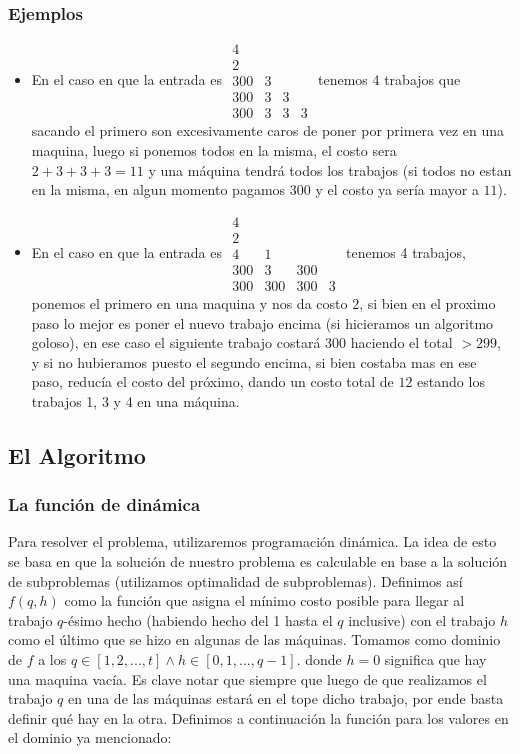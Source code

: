 \documentclass[A4paper,oneside,fleqn,11pt]{article}
\theoremstyle{definition}
\begin{document}
\subsubsection{Ejemplos}
\begin{itemize}
\item En el caso en que la entrada es $\begin{matrix}
  4 &  &  &  \\
  2 &  &  &  \\
  300 & 3 &  &  \\
  300 & 3 & 3 &  \\
  300 & 3 & 3 & 3 
\end{matrix}$ tenemos 4 trabajos que sacando el primero son excesivamente caros de poner por primera vez en una maquina, luego si ponemos todos en la misma, el costo sera $2+3+3+3=11$ y una máquina tendrá todos los trabajos (si todos no estan en la misma, en algun momento pagamos $300$ y el costo ya sería mayor a $11$).
\item En el caso en que la entrada es $\begin{matrix}
  4 &  &  &  \\
  2 &  &  &  \\
  4 & 1 &  &  \\
  300 & 3 & 300 &  \\
  300 & 300 & 300 & 3 
\end{matrix}$ tenemos 4 trabajos, ponemos el primero en una maquina y nos da costo $2$, si bien en el proximo paso lo mejor es poner el nuevo trabajo encima (si hicieramos un algoritmo goloso), en ese caso el siguiente trabajo costará $300$ haciendo el total $>299$, y si no hubieramos puesto el segundo encima, si bien costaba mas en ese paso, reducía el costo del próximo, dando un costo total de $12$ estando los trabajos 1, 3 y 4 en una máquina.
\end{itemize}


\subsection{El Algoritmo}

\subsubsection{La función de dinámica}
Para resolver el problema, utilizaremos programación dinámica. La idea de esto se basa en que la solución de nuestro problema es calculable en base a la solución de subproblemas (utilizamos optimalidad de subproblemas). Definimos así $f(q,h)$ como la función que asigna el mínimo costo posible para llegar al trabajo $q$-ésimo hecho (habiendo hecho del 1 hasta el $q$ inclusive) con el trabajo $h$ como el último que se hizo en algunas de las máquinas. Tomamos como dominio de $f$ a los $q \in [1,2,...,t] \land h \in [0,1,...,q-1]$. donde $h=0$ significa que hay una maquina vacía. Es clave notar que siempre que luego de que realizamos el trabajo $q$ en una de las máquinas estará en el tope dicho trabajo, por ende basta definir qué hay en la otra. Definimos a continuación la función para los valores en el dominio ya mencionado:
\end{document}
